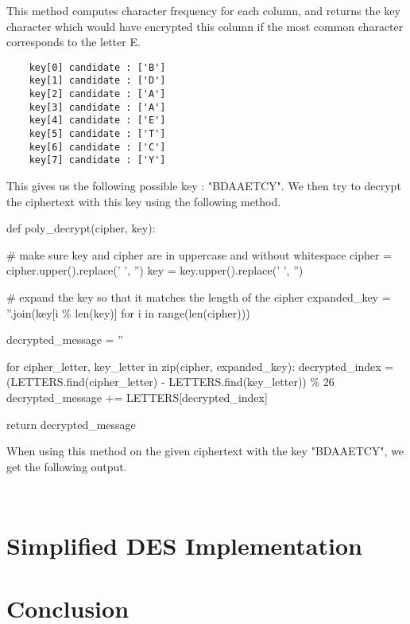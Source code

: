 \documentclass{article}
\begin{document}
This method computes character frequency for each column, and returns the key character which would have encrypted this column if the most common character corresponds to the letter E.

\begin{verbatim}
    key[0] candidate : ['B']
    key[1] candidate : ['D']
    key[2] candidate : ['A']
    key[3] candidate : ['A']
    key[4] candidate : ['E']
    key[5] candidate : ['T']
    key[6] candidate : ['C']
    key[7] candidate : ['Y']

\end{verbatim}

This gives us the following possible key : "BDAAETCY". We then try to decrypt the ciphertext with this key using the following method.

\begin{python}
def poly_decrypt(cipher, key):

    # make sure key and cipher are in uppercase and without whitespace
    cipher = cipher.upper().replace(' ', '')
    key = key.upper().replace(' ', '')

    # expand the key so that it matches the length of the cipher
    expanded_key = ''.join(key[i \% len(key)] for i in range(len(cipher)))

    decrypted_message = ''

    for cipher_letter, key_letter in zip(cipher, expanded_key):
        decrypted_index = (LETTERS.find(cipher_letter) - LETTERS.find(key_letter)) \% 26
        decrypted_message += LETTERS[decrypted_index]

    return decrypted_message
\end{python}

When using this method on the given ciphertext with the key "BDAAETCY", we get the following output.

\begin{verbatim}
    
\end{verbatim}

\section{Simplified DES Implementation}

\section{Conclusion}




\end{document}
